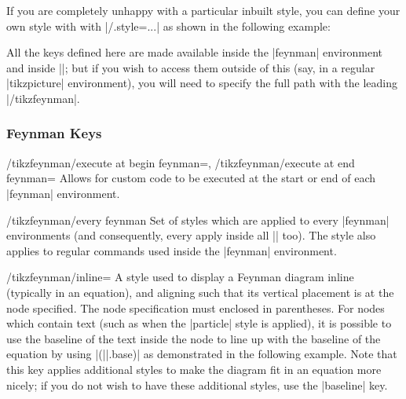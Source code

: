 \documentclass[a4paper,final]{ltxdoc}
\begin{document}
\begin{codeexample}[execute code=false]

If you are completely unhappy with a particular inbuilt style, you can define
your own style with with |/.style={...}| as shown in the
following example:
\begin{codeexample}[execute code=false]
\end{codeexample}

All the keys defined here are made available inside the |{feynman}| environment
and inside |\feynmandiagram|; but if you wish to access them outside of this
(say, in a regular |{tikzpicture}| environment), you will need to specify the
full path with the leading |/tikzfeynman|.

\subsubsection{Feynman Keys}
\label{subsubsec:feynman_keys}

\begin{keylist}{%
    /tikzfeynman/execute at begin feynman=,
    /tikzfeynman/execute at end feynman=}
  Allows for custom code to be executed at the start or end of each |{feynman}|
  environment.
\end{keylist}

\begin{stylekey}{/tikzfeynman/every feynman}
  Set of styles which are applied to every |{feynman}| environments (and
  consequently, every apply inside all |\feynmandiagram| too).  The style also
  applies to regular \tikzname{} commands used inside the |{feynman}|
  environment.

\begin{codeexample}[]
\end{codeexample}
\end{stylekey}

\begin{stylekey}{/tikzfeynman/inline=}
  A style used to display a Feynman diagram inline (typically in an equation),
  and aligning such that its vertical placement is at the node specified.  The
  node specification must enclosed in parentheses.  For nodes which contain text
  (such as when the |particle| style is applied), it is possible to use the
  baseline of the text inside the node to line up with the baseline of the
  equation by using |(||.base)| as demonstrated in the following
  example.  Note that this key applies additional styles to make the diagram fit
  in an equation more nicely; if you do not wish to have these additional
  styles, use the |baseline| key.


\end{stylekey}
\end{codeexample}
\end{document}
